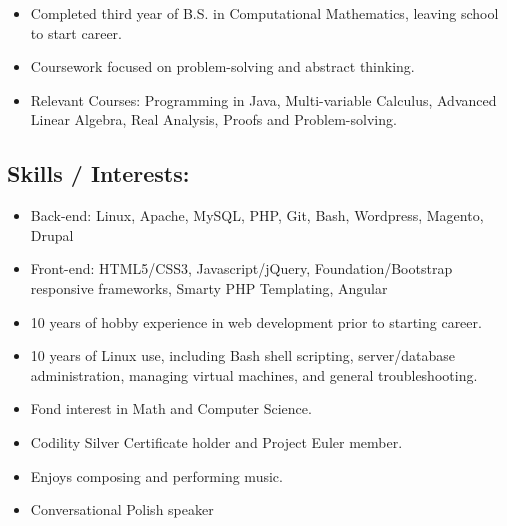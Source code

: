 \begin{itemize}
\tightlist
\item
  Completed third year of B.S. in Computational Mathematics, leaving
  school to start career.
\item
  Coursework focused on problem-solving and abstract thinking.
\item
  Relevant Courses: Programming in Java, Multi-variable Calculus,
  Advanced Linear Algebra, Real Analysis, Proofs and Problem-solving.
\end{itemize}

\hypertarget{skills-interests}{%
\subsection{Skills / Interests:}\label{skills-interests}}

\begin{itemize}
\tightlist
\item
  Back-end: Linux, Apache, MySQL, PHP, Git, Bash, Wordpress, Magento,
  Drupal
\item
  Front-end: HTML5/CSS3, Javascript/jQuery, Foundation/Bootstrap
  responsive frameworks, Smarty PHP Templating, Angular
\item
  10 years of hobby experience in web development prior to starting
  career.
\item
  10 years of Linux use, including Bash shell scripting, server/database
  administration, managing virtual machines, and general
  troubleshooting.
\item
  Fond interest in Math and Computer Science.
\item
  Codility Silver Certificate holder and Project Euler member.
\item
  Enjoys composing and performing music.
\item
  Conversational Polish speaker
\end{itemize}
